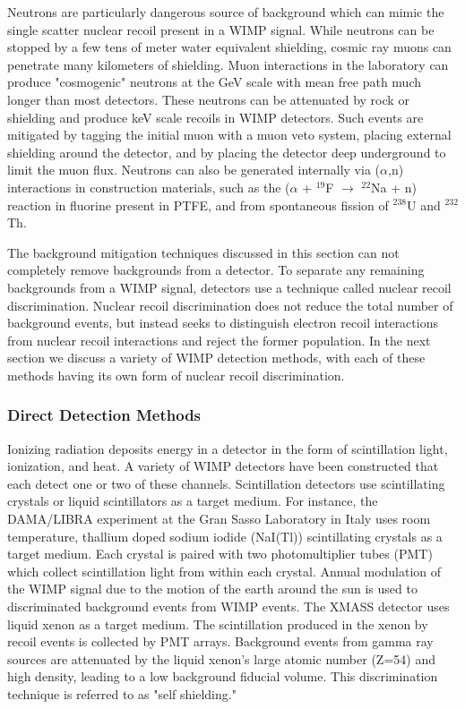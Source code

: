 Neutrons are particularly dangerous source of background which can mimic the single scatter nuclear recoil present in a WIMP signal.  While neutrons can be stopped by a few tens of meter water equivalent shielding, cosmic ray muons can penetrate many kilometers of shielding.  Muon interactions in the laboratory can produce "cosmogenic" neutrons at the GeV scale with mean free path much longer than most detectors.  These neutrons can be attenuated by rock or shielding and produce keV scale recoils in WIMP detectors.   Such events are mitigated by tagging the initial muon with a muon veto system, placing external shielding around the detector, and by placing the detector deep underground to limit the muon flux.  Neutrons can also be generated internally via ($\alpha$,n) interactions in construction materials, such as the ($\alpha$ + $^{19}$F $\rightarrow$ $^{22}$Na + n) reaction in fluorine present in PTFE, and from spontaneous fission of $^{238}$U and $^{232}$Th.  

The background mitigation techniques discussed in this section can not completely remove backgrounds from a detector.  To separate any remaining backgrounds from a WIMP signal, detectors use a technique called nuclear recoil discrimination.  Nuclear recoil discrimination does not reduce the total number of background events, but instead seeks to distinguish electron recoil interactions from nuclear recoil interactions and reject the former population.  In the next section we discuss a variety of WIMP detection methods, with each of these methods having its own form of nuclear recoil discrimination. 

\subsubsection{Direct Detection Methods} 
Ionizing radiation deposits energy in a detector in the form of scintillation light, ionization, and heat.  A variety of WIMP detectors have been constructed that each detect one or two of these channels.  Scintillation detectors use scintillating crystals or liquid scintillators as a target medium. For instance, the DAMA/LIBRA experiment at the Gran Sasso Laboratory in Italy uses room temperature, thallium doped sodium iodide (NaI(Tl)) scintillating crystals as a target medium.  Each crystal is paired with two photomultiplier tubes (PMT) which collect scintillation light from within each crystal.  Annual modulation of the WIMP signal due to the motion of the earth around the sun is used to discriminated background events from WIMP events.  The XMASS detector uses liquid xenon as a target medium.  The scintillation produced in the xenon by recoil events is collected by PMT arrays. Background events from gamma ray sources are attenuated by the liquid xenon's large atomic number (Z=54) and high density, leading to a low background fiducial volume.  This discrimination technique is referred to as "self shielding." 

